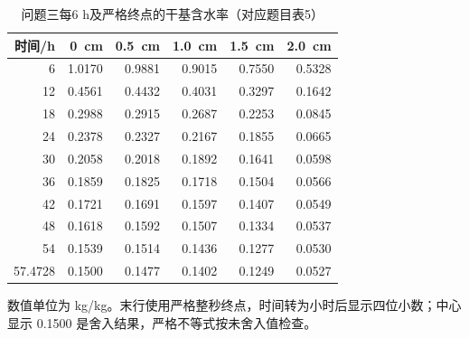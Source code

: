 \begin{table}[htbp]
\centering\small
\caption{问题三每6 h及严格终点的干基含水率（对应题目表5）}\label{tab:paper5}
\begin{tabular}{rrrrrr}
\toprule
时间/h & 0~cm & 0.5~cm & 1.0~cm & 1.5~cm & 2.0~cm \\
\midrule
6 & 1.0170 & 0.9881 & 0.9015 & 0.7550 & 0.5328 \\
12 & 0.4561 & 0.4432 & 0.4031 & 0.3297 & 0.1642 \\
18 & 0.2988 & 0.2915 & 0.2687 & 0.2253 & 0.0845 \\
24 & 0.2378 & 0.2327 & 0.2167 & 0.1855 & 0.0665 \\
30 & 0.2058 & 0.2018 & 0.1892 & 0.1641 & 0.0598 \\
36 & 0.1859 & 0.1825 & 0.1718 & 0.1504 & 0.0566 \\
42 & 0.1721 & 0.1691 & 0.1597 & 0.1407 & 0.0549 \\
48 & 0.1618 & 0.1592 & 0.1507 & 0.1334 & 0.0537 \\
54 & 0.1539 & 0.1514 & 0.1436 & 0.1277 & 0.0530 \\
57.4728 & 0.1500 & 0.1477 & 0.1402 & 0.1249 & 0.0527 \\
\bottomrule
\end{tabular}
\par\smallskip\begin{minipage}{0.93\linewidth}\footnotesize 数值单位为 kg/kg。末行使用严格整秒终点，时间转为小时后显示四位小数；中心显示 0.1500 是舍入结果，严格不等式按未舍入值检查。\end{minipage}
\end{table}
